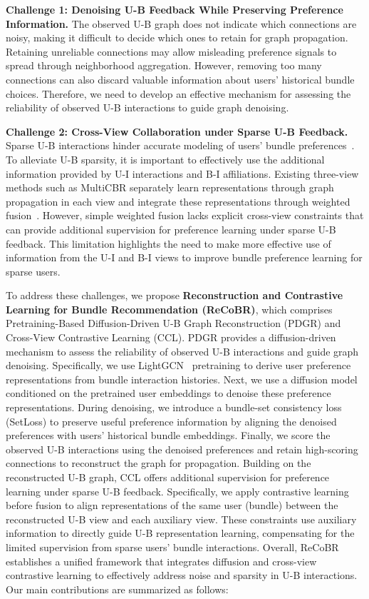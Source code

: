 \documentclass[letterpaper,journal]{IEEEtran}
\begin{document}
\textbf{Challenge 1: Denoising U-B Feedback While Preserving Preference Information.} The observed U-B graph does not indicate which connections are noisy, making it difficult to decide which ones to retain for graph propagation. Retaining unreliable connections may allow misleading preference signals to spread through neighborhood aggregation. However, removing too many connections can also discard valuable information about users' historical bundle choices. Therefore, we need to develop an effective mechanism for assessing the reliability of observed U-B interactions to guide graph denoising.

\textbf{Challenge 2: Cross-View Collaboration under Sparse U-B Feedback.} Sparse U-B interactions hinder accurate modeling of users' bundle preferences~\cite{yu2022uhbr,jiang2026mgcbr}. To alleviate U-B sparsity, it is important to effectively use the additional information provided by U-I interactions and B-I affiliations. Existing three-view methods such as MultiCBR separately learn representations through graph propagation in each view and integrate these representations through weighted fusion~\cite{ma2024multicbr}. However, simple weighted fusion lacks explicit cross-view constraints that can provide additional supervision for preference learning under sparse U-B feedback. This limitation highlights the need to make more effective use of information from the U-I and B-I views to improve bundle preference learning for sparse users.

To address these challenges, we propose \textbf{Reconstruction and Contrastive Learning for Bundle Recommendation (ReCoBR)}, which comprises Pretraining-Based Diffusion-Driven U-B Graph Reconstruction (PDGR) and Cross-View Contrastive Learning (CCL). PDGR provides a diffusion-driven mechanism to assess the reliability of observed U-B interactions and guide graph denoising. Specifically, we use LightGCN~\cite{he2020lightgcn} pretraining to derive user preference representations from bundle interaction histories. Next, we use a diffusion model conditioned on the pretrained user embeddings to denoise these preference representations. During denoising, we introduce a bundle-set consistency loss (SetLoss) to preserve useful preference information by aligning the denoised preferences with users' historical bundle embeddings. Finally, we score the observed U-B interactions using the denoised preferences and retain high-scoring connections to reconstruct the graph for propagation. Building on the reconstructed U-B graph, CCL offers additional supervision for preference learning under sparse U-B feedback. Specifically, we apply contrastive learning before fusion to align representations of the same user (bundle) between the reconstructed U-B view and each auxiliary view. These constraints use auxiliary information to directly guide U-B representation learning, compensating for the limited supervision from sparse users' bundle interactions. Overall, ReCoBR establishes a unified framework that integrates diffusion and cross-view contrastive learning to effectively address noise and sparsity in U-B interactions.
Our main contributions are summarized as follows:
\end{document}
